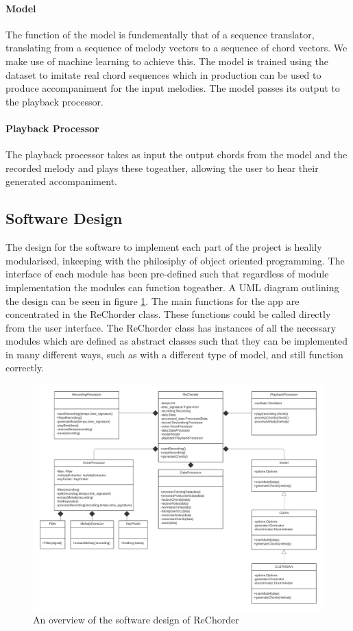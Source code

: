 \paragraph{Model}

The function of the model is fundementally that of a sequence translator, translating from a sequence of melody vectors to a sequence of chord vectors.
We make use of machine learning to achieve this. 
The model is trained using the dataset to imitate real chord sequences which in production can be used to produce accompaniment for the input melodies.
The model passes its output to the playback processor.
\paragraph{Playback Processor}

The playback processor takes as input the output chords from the model and the recorded melody and plays these togeather, allowing the user to hear their generated accompaniment.

\subsection{Software Design}

The design for the software to implement each part of the project is healily modularised, inkeeping with the philosiphy of object oriented programming.
The interface of each module has been pre-defined such that regardless of module implementation the modules can function togeather. 
A UML diagram outlining the design can be seen in figure \ref{fig:SoftwareOverview}.
The main functions for the app are concentrated in the ReChorder class.
These functions could be called directly from the user interface.
The ReChorder class has instances of all the necessary modules which are defined as abstract classes such that they can be implemented in many different ways, such as with a different type of model, and still function correctly.

\begin{figure}
    \centering
    \includegraphics[width=0.8\columnwidth]{Figures/SoftwareOverview}
    \decoRule
    \caption[]{An overview of the software design of ReChorder}
    \label{fig:SoftwareOverview}
\end{figure}


